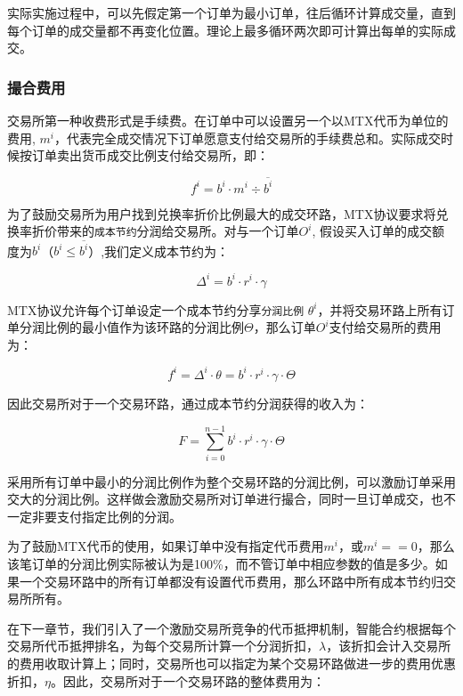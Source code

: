 \documentclass[UTF8,nofonts]{ctexart}
\begin{document}
实际实施过程中，可以先假定第一个订单为最小订单，往后循环计算成交量，直到每个订单的成交量都不再变化位置。理论上最多循环两次即可计算出每单的实际成交。

\subsubsection{撮合费用\label{sec:fee}}

交易所第一种收费形式是手续费。在订单中可以设置另一个以MTX代币为单位的费用, $m^i$，代表完全成交情况下订单愿意支付给交易所的手续费总和。实际成交时候按订单卖出货币成交比例支付给交易所，即：

\begin{equation*}
f^i = b^i \cdot m^i  \div \overline{b^i}
\end{equation*}


为了鼓励交易所为用户找到兑换率折价比例最大的成交环路，MTX协议要求将兑换率折价带来的\texttt{成本节约}分润给交易所。对与一个订单$O^i$, 假设买入订单的成交额度为$b^i$（$b^i \le \overline{b^i}$）,我们定义成本节约为：

\begin{equation*}
\Delta^i = b^i \cdot r^i \cdot \gamma
\end{equation*}

MTX协议允许每个订单设定一个成本节约分享\texttt{分润比例} $\theta^i$，并将交易环路上所有订单分润比例的最小值作为该环路的分润比例$\Theta$，那么订单$O^i$支付给交易所的费用为：

\begin{equation*}
f^i = \Delta^i \cdot \theta = b^i \cdot r^i \cdot \gamma \cdot \Theta
\end{equation*}

因此交易所对于一个交易环路，通过成本节约分润获得的收入为：

\begin{equation*}
F = \sum^{n-1}_{i=0} b^i \cdot r^i \cdot \gamma \cdot \Theta
\end{equation*}

采用所有订单中最小的分润比例作为整个交易环路的分润比例，可以激励订单采用交大的分润比例。这样做会激励交易所对订单进行撮合，同时一旦订单成交，也不一定非要支付指定比例的分润。


为了鼓励MTX代币的使用，如果订单中没有指定代币费用$m^i$，或$m^i==0$，那么该笔订单的分润比例实际被认为是100\%，而不管订单中相应参数的值是多少。如果一个交易环路中的所有订单都没有设置代币费用，那么环路中所有成本节约归交易所所有。

在下一章节，我们引入了一个激励交易所竞争的代币抵押机制，智能合约根据每个交易所代币抵押排名，为每个交易所计算一个分润折扣，$\lambda$，该折扣会计入交易所的费用收取计算上；同时，交易所也可以指定为某个交易环路做进一步的费用优惠折扣，$\eta$。因此，交易所对于一个交易环路的整体费用为：
\end{document}
